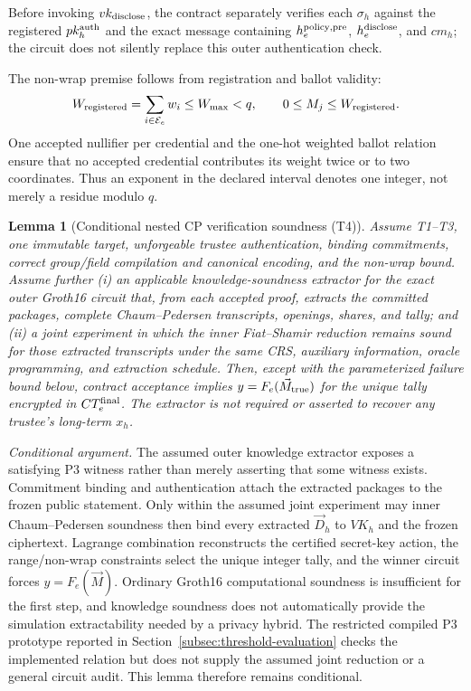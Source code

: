 \documentclass[pdflatex,sn-mathphys-num]{sn-jnl}%
\theoremstyle{thmstyleone}%
\newtheorem{lemma}[theorem]{Lemma}%
\theoremstyle{thmstyletwo}%
\theoremstyle{thmstylethree}%
\begin{document}
Before invoking $vk_{\rm disclose}$, the contract separately verifies each
$\sigma_h$ against the registered $pk_h^{\rm auth}$ and the exact message
containing $h_e^{\rm policy,pre}$, $h_e^{\rm disclose}$, and $cm_h$; the
circuit does not silently replace this outer authentication check.

The non-wrap premise follows from registration and ballot validity:
\[
 W_{\rm registered}=\sum_{i\in\mathcal E_e}w_i\leq W_{\max}<q,
 \qquad 0\leq M_j\leq W_{\rm registered}.
\]
One accepted nullifier per credential and the one-hot weighted ballot relation
ensure that no accepted credential contributes its weight twice or to two
coordinates.  Thus an exponent in the declared interval denotes one integer,
not merely a residue modulo $q$.

\begin{lemma}[Conditional nested CP verification soundness (T4)]
\label{thm:th-disclosure-soundness}
Assume T1--T3, one immutable target, unforgeable trustee authentication,
binding commitments, correct group/field compilation and canonical encoding,
and the non-wrap bound.  Assume further (i) an applicable knowledge-soundness
extractor for the exact outer Groth16 circuit that, from each accepted proof,
extracts the committed packages, complete Chaum--Pedersen transcripts,
openings, shares, and tally; and (ii) a joint experiment in which the inner
Fiat--Shamir reduction remains sound for those extracted transcripts under the
same CRS, auxiliary information, oracle programming, and extraction schedule.
Then, except with the parameterized failure bound below, contract acceptance
implies $y=F_e(\vec M_{\rm true})$ for the unique tally encrypted in
$CT_e^{\rm final}$.  The extractor is not required or asserted to recover any
trustee's long-term $x_h$.
\end{lemma}

\textit{Conditional argument.}  The assumed outer knowledge extractor exposes
a satisfying P3 witness rather than merely asserting that some witness exists.
Commitment binding and authentication attach the extracted packages to the
frozen public statement.  Only within the assumed joint experiment may inner
Chaum--Pedersen soundness then bind every extracted $\vec D_h$ to $VK_h$ and
the frozen ciphertext.  Lagrange combination reconstructs the certified
secret-key action, the range/non-wrap constraints select the unique integer
tally, and the winner circuit forces $y=F_e(\vec M)$.  Ordinary Groth16
computational soundness is insufficient for the first step, and knowledge
soundness does not automatically provide the simulation extractability needed
by a privacy hybrid.  The restricted compiled P3 prototype reported in
Section~\ref{subsec:threshold-evaluation} checks the implemented relation but
does not supply the assumed joint reduction or a general circuit audit.
This lemma therefore remains conditional.
\end{document}
